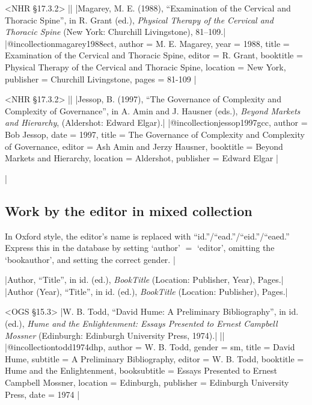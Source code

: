 \documentclass[extrafontsizes,11pt,a4paper,oneside]{memoir}
\newcommand*{\lit}[1]{\textsf{#1}}
\newcommand*{\code}[1]{`\textsf{#1}'}
\begin{document}
\bibexample<NHR \S17.3.2>
||%
|Magarey, M. E. (1988), \enquote{Examination of the Cervical and Thoracic Spine}, in R. Grant (ed.), \emph{Physical Therapy of the Cervical and Thoracic Spine} (New York: Churchill Livingstone), 81–109.|%
|@incollection{magarey1988ect,
  author = {M. E. Magarey},
  year = {1988},
  title = {Examination of the Cervical and Thoracic Spine},
  editor = {R. Grant},
  booktitle = {Physical Therapy of the Cervical and Thoracic Spine},
  location = {New York},
  publisher = {Churchill Livingstone},
  pages = {81-109}
}|

\bibexample<NHR \S17.3.2>
||%
|Jessop, B. (1997), \enquote{The Governance of Complexity and Complexity of Governance}, in A. Amin and J. Hausner (eds.), \emph{Beyond Markets and Hierarchy}, (Aldershot: Edward Elgar).|%
|@incollection{jessop1997gcc,
  author = {Bob Jessop},
  date = {1997},
  title = {The Governance of Complexity and Complexity of Governance},
  editor = {Ash Amin and Jerzy Hausner},
  booktitle = {Beyond Markets and Hierarchy},
  location = {Aldershot},
  publisher = {Edward Elgar}
}|

\todoc|
\subsection{Work by the editor in mixed collection}

In Oxford style, the editor's name is replaced with \enquote{id.}\slash \enquote{ead.}\slash \enquote{eid.}\slash \enquote{eaed.} Express this in the database by setting \code{author} $=$ \code{editor}, omitting the \code{bookauthor}, and setting the correct gender.
|

\specs
|Author, \enquote{Title}, \lit{in id.} (\lit{ed.}), \emph{BookTitle} (Location: Publisher, Year), Pages.|%
|Author (Year), \enquote{Title}, \lit{in id.} (\lit{ed.}), \emph{BookTitle} (Location: Publisher), Pages.|

\bibexample<OGS \S15.3>
|W. B. Todd, \enquote{David Hume: A Preliminary Bibliography}, in id. (ed.), \emph{Hume and the Enlightenment: Essays Presented to Ernest Campbell Mossner} (Edinburgh: Edinburgh University Press, 1974).|%
||%
|@incollection{todd1974dhp,
  author = {W. B. Todd},
  gender = {sm},
  title = {David Hume},
  subtitle = {A Preliminary Bibliography},
  editor = {W. B. Todd},
  booktitle = {Hume and the Enlightenment},
  booksubtitle = {Essays Presented to Ernest Campbell Mossner},
  location = {Edinburgh},
  publisher = {Edinburgh University Press},
  date = {1974}
}|
\end{document}
